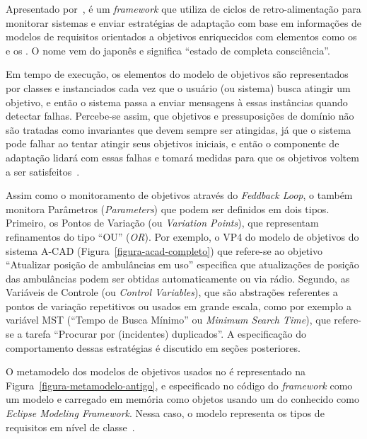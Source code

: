 Apresentado por~\cite{tesevitor}, \zanshin é um \textit{framework} que utiliza de ciclos de retro-alimentação para monitorar sistemas e enviar estratégias de adaptação com base em informações de modelos de requisitos orientados a objetivos enriquecidos com elementos como os \awreqs e os \evoreqs. O nome \zanshin vem do japonês e significa ``estado de completa consciência''.

Em tempo de execução, os elementos do modelo de objetivos são representados por classes e instanciados cada vez que o usuário (ou sistema) busca atingir um objetivo, e então o sistema passa a enviar mensagens à essas instâncias quando detectar falhas. Percebe-se assim, que objetivos e pressuposições de domínio não são tratadas como invariantes que devem sempre ser atingidas, já que o sistema pode falhar ao tentar atingir seus objetivos iniciais, e então o componente de adaptação lidará com essas falhas e tomará medidas para que os objetivos voltem a ser satisfeitos~\cite{souza2013requirements}.

Assim como o monitoramento de objetivos através do \textit{Feddback Loop}, o \zanshin também monitora Parâmetros (\textit{Parameters}) que podem ser definidos em dois tipos. Primeiro, os Pontos de Variação (ou \textit{Variation Points}), que representam refinamentos do tipo ``OU'' (\textit{OR}). Por exemplo, o VP4 do modelo de objetivos do sistema A-CAD (Figura~\ref{figura-acad-completo}) que refere-se ao objetivo ``Atualizar posição de ambulâncias em uso'' especifica que atualizações de posição das ambulâncias podem ser obtidas automaticamente ou via rádio. Segundo, as Variáveis de Controle (ou \textit{Control Variables}), que são abstrações referentes a pontos de variação repetitivos ou usados em grande escala, como por exemplo a variável MST (``Tempo de Busca Mínimo'' ou \textit{Minimum Search Time}), que refere-se a tarefa ``Procurar por (incidentes) duplicados''. A especificação do comportamento dessas estratégias é discutido em seções posteriores.

O metamodelo dos modelos de objetivos usados no \zanshin é representado na Figura~\ref{figura-metamodelo-antigo}, e especificado no código do \textit{framework} como um modelo \ecore e carregado em memória como objetos \java usando um \framework do \eclipse conhecido como \textit{Eclipse Modeling Framework}. Nessa caso, o modelo \ecore representa os tipos de requisitos em nível de classe~\cite{souza2013requirements}. 


